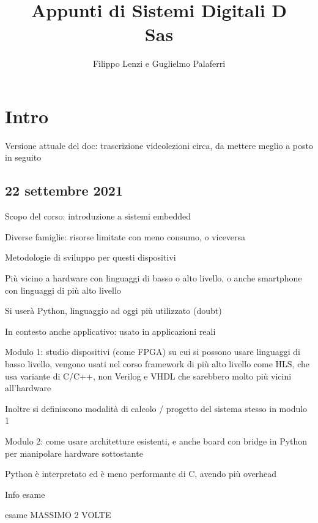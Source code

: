 \documentclass[a4paper,oneside]{book}
\begin{document}
    \title{
        Appunti di Sistemi Digitali D \\
        \normalsize Sas
        }
	\author{Filippo Lenzi e Guglielmo Palaferri}

    \maketitle

	\tableofcontents
    \thispagestyle{empty}

    \chapter{Intro}

    Versione attuale del doc: trascrizione videolezioni circa, da
    mettere meglio a posto in seguito

    \section{22 settembre 2021}

    Scopo del corso: introduzione a sistemi embedded

    Diverse famiglie: risorse limitate con meno consumo, o viceversa

    Metodologie di sviluppo per questi dispositivi

    Più vicino a hardware con linguaggi di basso o alto livello, 
    o anche smartphone con linguaggi di più alto livello

    Si userà Python, linguaggio ad oggi più utilizzato (doubt)

    In contesto anche applicativo: usato in applicazioni reali

    Modulo 1: studio dispositivi (come FPGA) su cui si possono usare 
    linguaggi di basso livello, vengono usati nel corso framework di 
    più alto livello come HLS, che usa variante di C/C++, non Verilog e 
    VHDL che sarebbero molto più vicini all'hardware

        Inoltre si definiscono modalità di calcolo / progetto del sistema
        stesso in modulo 1

    Modulo 2: come usare architetture esistenti, e anche board con bridge 
    in Python per manipolare hardware sottostante

    Python è interpretato ed è meno performante di C, avendo più overhead

    Info esame

    esame MASSIMO 2 VOLTE
\end{document}
